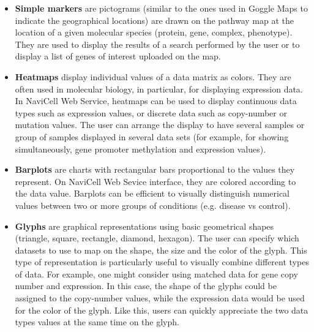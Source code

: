 \documentclass[a4,center,fleqn]{NAR}
\begin{document}
\begin{itemize}

\item \textbf{Simple markers} are pictograms (similar to the ones used in Goggle Maps
to indicate the geographical locations) are drawn on the pathway map at the location
of a given molecular species (protein, gene, complex, phenotype). They are used to display the
results of a search performed by the user or to display a list of genes of interest
uploaded on the map.

\item \textbf{Heatmaps} display individual values of a data matrix as
colors. They are often used in molecular biology, in particular, for displaying expression
data. In NaviCell Web Service, heatmaps can be used to
display continuous data types such as expression values, or discrete data such
as copy-number or mutation values. The user can arrange the display to have
several samples or group of samples displayed in several data sets
(for example, for showing simultaneously, gene promoter methylation and expression values).

\item \textbf{Barplots} are charts with rectangular bars proportional to the values
they represent. On NaviCell Web Sevice interface, they are colored according to the
data value. Barplots can be efficient to visually distinguish numerical
values between two or more groups of conditions (e.g. disease vs control).

\item \textbf{Glyphs} are graphical representations using basic geometrical
shapes (triangle, square, rectangle, diamond, hexagon). The user can specify
which datasets to use to map on the shape, the size and the color of the glyph. This
type of representation is particularly useful to visually combine different
types of data. For example, one might consider using matched data for
gene copy number and expression. In this case, the shape of the
glyphs could be assigned to the copy-number values, while the expression data
would be used for the color of the glyph. Like this, users can quickly
appreciate the two data types values at the same time on the glyph.


\end{itemize}
\end{document}
